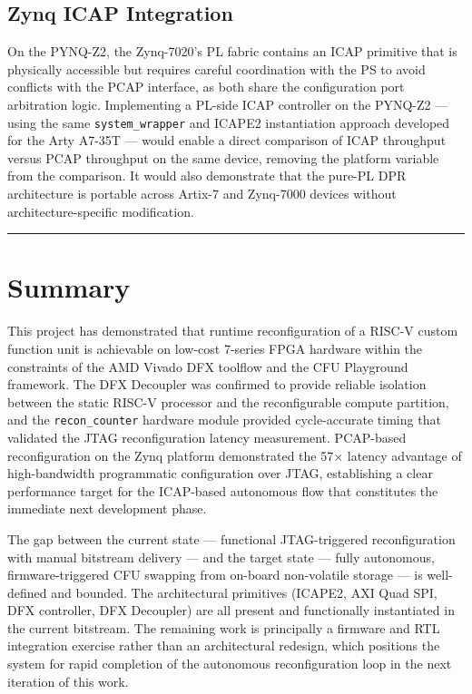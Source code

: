 \subsection{Zynq ICAP Integration}

On the PYNQ-Z2, the Zynq-7020's PL fabric contains an ICAP primitive that is physically accessible but requires careful coordination with the PS to avoid conflicts with the PCAP interface, as both share the configuration port arbitration logic. Implementing a PL-side ICAP controller on the PYNQ-Z2 — using the same \texttt{system\_wrapper} and ICAPE2 instantiation approach developed for the Arty A7-35T — would enable a direct comparison of ICAP throughput versus PCAP throughput on the same device, removing the platform variable from the comparison. It would also demonstrate that the pure-PL DPR architecture is portable across Artix-7 and Zynq-7000 devices without architecture-specific modification.

\vspace{0.4em}\hrule\vspace{0.4em}

\section{Summary}

This project has demonstrated that runtime reconfiguration of a RISC-V custom function unit is achievable on low-cost 7-series FPGA hardware within the constraints of the AMD Vivado DFX toolflow and the CFU Playground framework. The DFX Decoupler was confirmed to provide reliable isolation between the static RISC-V processor and the reconfigurable compute partition, and the \texttt{recon\_counter} hardware module provided cycle-accurate timing that validated the JTAG reconfiguration latency measurement. PCAP-based reconfiguration on the Zynq platform demonstrated the 57× latency advantage of high-bandwidth programmatic configuration over JTAG, establishing a clear performance target for the ICAP-based autonomous flow that constitutes the immediate next development phase.

The gap between the current state — functional JTAG-triggered reconfiguration with manual bitstream delivery — and the target state — fully autonomous, firmware-triggered CFU swapping from on-board non-volatile storage — is well-defined and bounded. The architectural primitives (ICAPE2, AXI Quad SPI, DFX controller, DFX Decoupler) are all present and functionally instantiated in the current bitstream. The remaining work is principally a firmware and RTL integration exercise rather than an architectural redesign, which positions the system for rapid completion of the autonomous reconfiguration loop in the next iteration of this work.
